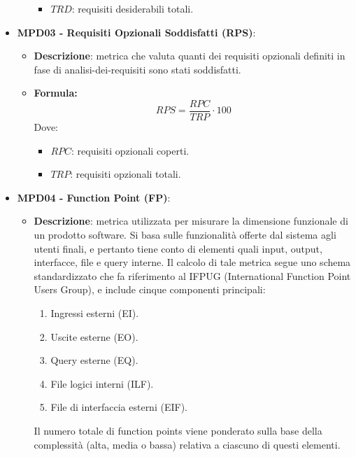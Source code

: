 \documentclass[10pt]{article}
\begin{document}
\begin{justify}
\begin{itemize}
\begin{itemize}
\begin{itemize}
                            \item $TRD$: requisiti desiderabili totali.
                        \end{itemize}
            \end{itemize}
    \item   \textbf{MPD03 - Requisiti Opzionali Soddisfatti (RPS)}:
            \begin{itemize}
                \item   \textbf{Descrizione}: metrica che valuta quanti dei requisiti opzionali definiti in fase di analisi-dei-requisiti sono stati soddisfatti.
                \item   \textbf{Formula:}
                        \[
                        RPS = \frac{RPC}{TRP} \cdot 100
                        \]
                        Dove:
                        \begin{itemize}
                            \item $RPC$: requisiti opzionali coperti.
                            \item $TRP$: requisiti opzionali totali.
                        \end{itemize}
            \end{itemize}
    \item   \textbf{MPD04 - Function Point (FP)}:
            \begin{itemize}
                \item   \textbf{Descrizione}: metrica utilizzata per misurare la dimensione funzionale di un prodotto software. Si basa sulle funzionalità offerte dal sistema agli utenti finali, e pertanto tiene conto di elementi quali input, output, interfacce, file e query interne.
                Il calcolo di tale metrica segue uno schema standardizzato che fa riferimento al IFPUG (International Function Point Users Group), e include cinque componenti principali:
                \begin{enumerate}
                    \item Ingressi esterni (EI).
                    \item Uscite esterne (EO).
                    \item Query esterne (EQ).
                    \item File logici interni (ILF).
                    \item File di interfaccia esterni (EIF).
                \end{enumerate}
                Il numero totale di function points viene ponderato sulla base della complessità (alta, media o bassa) relativa a ciascuno di questi elementi.

\end{itemize}
\end{itemize}
\end{justify}
\end{document}
